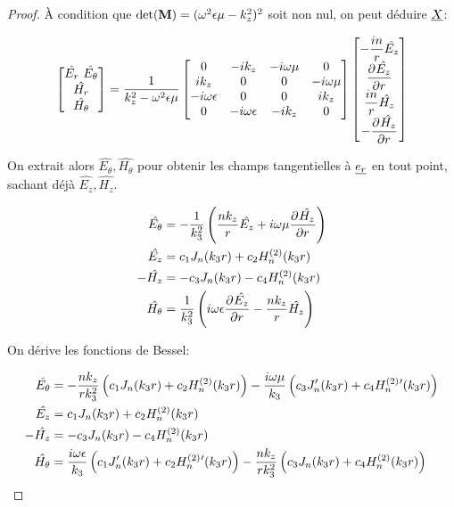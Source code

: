 \begin{proof}
        À condition que $\det(\mat{M}) = (\w^2\eps\mu-k_z^2)^2$ soit non nul, on peut déduire $\v{X}$:

        \begin{equation}
            \begin{bmatrix}
                \hat{E_r}\
                \hat{E_\theta}\\
                \hat{H_r}\\
                \hat{H_\theta}
            \end{bmatrix} =
            \frac{1}{k_z^2 - \w^2\eps\mu}
            \begin{bmatrix}
            0 & -ik_z & -i\w\mu & 0 
            \\
            ik_z & 0 & 0 & -i\w\mu
            \\
            -i\w\eps & 0 & 0 & ik_z
            \\
            0 & -i\w\eps & -ik_z & 0
            \end{bmatrix}
            \begin{bmatrix}
                -\frac{in}{r}\hat{E_z}\\
                \ddr{r}{\hat{E_z}}\\
                \frac{in}{r}\hat{H_z}\\
                -\ddr{r}{\hat{H_z}}
            \end{bmatrix}
        \end{equation}

        On extrait alors $\hat{E_\theta}, \hat{H_\theta}$ pour obtenir les champs tangentielles à $\v{e_r}$ en tout point, sachant déjà $\hat{E_z}, \hat{H_z}$.

        \begin{align}
            \hat{E_\theta} &= -\frac{1}{k_3^2}\left(\frac{nk_z}{r}\hat{E_z} + i\w\mu\ddr{r}{\hat{H_z}}\right)
            \\
            \hat{E_z} &= c_1 J_n(k_3 r) + c_2 H_n^{(2)}(k_3 r)
            \\
            -\hat{H_z} &= -c_3 J_n(k_3 r) - c_4 H_n^{(2)}(k_3 r)
            \\
            \hat{H_\theta} &= \frac{1}{k_3^2}\left(i\w\eps\ddr{r}{\hat{E_z}} - \frac{nk_z}{r}\hat{H_z}\right)
        \end{align}

        On dérive les fonctions de Bessel:

       \begin{align}
            \hat{E_\theta} &= -\frac{nk_z}{rk_3^2}\left(c_1J_n(k_3r) + c_2 H_n^{(2)}(k_3r)\right) - \frac{i\w\mu}{k_3}\left(c_3J_n'(k_3r) + c_4 H_n^{(2)}{}'(k_3r)\right)
            \\
            \hat{E_z} &= c_1 J_n(k_3 r) + c_2 H_n^{(2)}(k_3 r)
            \\
            -\hat{H_z} &= -c_3 J_n(k_3 r) - c_4 H_n^{(2)}(k_3 r)
            \\
            \hat{H_\theta} &= \frac{i\w\eps}{k_3}\left(c_1J_n'(k_3r) + c_2 H_n^{(2)}{}'(k_3r)\right) - \frac{nk_z}{rk_3^2}\left(c_3J_n(k_3r) + c_4 H_n^{(2)}(k_3r)\right)
        \end{align}


\end{proof}
